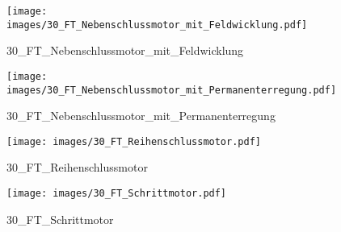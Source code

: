 %
%
\begin{figure}[!hb]%
    \centering
  \texttt{[image: images/30\_FT\_Nebenschlussmotor\_mit\_Feldwicklung.pdf]}%
  \caption{30_FT_Nebenschlussmotor_mit_Feldwicklung}%
\end{figure}

%
%
\begin{figure}[!hb]%
    \centering
  \texttt{[image: images/30\_FT\_Nebenschlussmotor\_mit\_Permanenterregung.pdf]}%
  \caption{30_FT_Nebenschlussmotor_mit_Permanenterregung}%
\end{figure}

%
%
\begin{figure}[!hb]%
    \centering
  \texttt{[image: images/30\_FT\_Reihenschlussmotor.pdf]}%
  \caption{30_FT_Reihenschlussmotor}%
\end{figure}

%
%
\begin{figure}[!hb]%
    \centering
  \texttt{[image: images/30\_FT\_Schrittmotor.pdf]}%
  \caption{30_FT_Schrittmotor}%
\end{figure}

